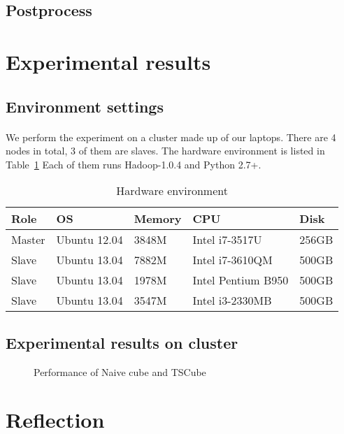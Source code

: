 \documentclass{article}
\begin{document}
\subsection{Postprocess}

\section{Experimental results}

\subsection{Environment settings}

\paragraph{}
We perform the experiment on a cluster made up of our laptops. There are 4 nodes in total, 3 of them are slaves. The hardware environment is listed in Table~\ref{table:env} Each of them runs Hadoop-1.0.4 and Python 2.7+.

\begin{table}[H]
\centering
\begin{tabular}{l l l l l}
Role & OS & Memory & CPU & Disk \\
\hline
Master & Ubuntu 12.04 & 3848M & Intel i7-3517U & 256GB \\
Slave & Ubuntu 13.04  & 7882M & Intel i7-3610QM & 500GB \\
Slave & Ubuntu 13.04 & 1978M & Intel Pentium B950 & 500GB \\
Slave & Ubuntu 13.04 & 3547M & Intel i3-2330MB & 500GB
\end{tabular}

\caption{Hardware environment}
\label{table:env}
\end{table}

\subsection{Experimental results on cluster}

\begin{figure}[H]


\caption{Performance of Naive cube and TSCube}
\label{fig:performance}
\end{figure}

\section{Reflection}


\end{document}
